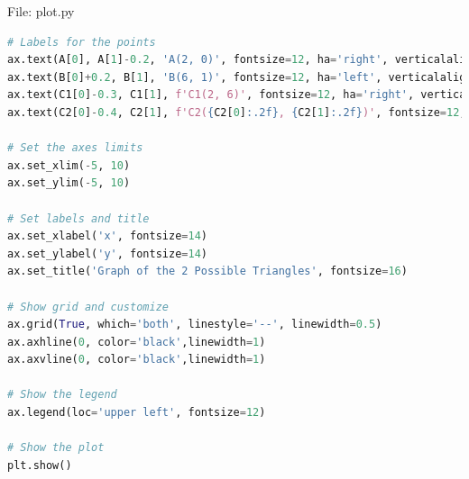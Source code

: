 \documentclass{beamer}
\numberwithin{equation}{section}
\theoremstyle{remark}
\begin{document}
\begin{frame}[fragile]{File: plot.py}
\begin{lstlisting}[language=Python]
# Labels for the points
ax.text(A[0], A[1]-0.2, 'A(2, 0)', fontsize=12, ha='right', verticalalignment='top')
ax.text(B[0]+0.2, B[1], 'B(6, 1)', fontsize=12, ha='left', verticalalignment='top')
ax.text(C1[0]-0.3, C1[1], f'C1(2, 6)', fontsize=12, ha='right', verticalalignment='top')
ax.text(C2[0]-0.4, C2[1], f'C2({C2[0]:.2f}, {C2[1]:.2f})', fontsize=12, ha='right', verticalalignment='center')

# Set the axes limits
ax.set_xlim(-5, 10)
ax.set_ylim(-5, 10)

# Set labels and title
ax.set_xlabel('x', fontsize=14)
ax.set_ylabel('y', fontsize=14)
ax.set_title('Graph of the 2 Possible Triangles', fontsize=16)

# Show grid and customize
ax.grid(True, which='both', linestyle='--', linewidth=0.5)
ax.axhline(0, color='black',linewidth=1)
ax.axvline(0, color='black',linewidth=1)

# Show the legend
ax.legend(loc='upper left', fontsize=12)

# Show the plot
plt.show()
\end{lstlisting}
\end{frame}
\end{document}
